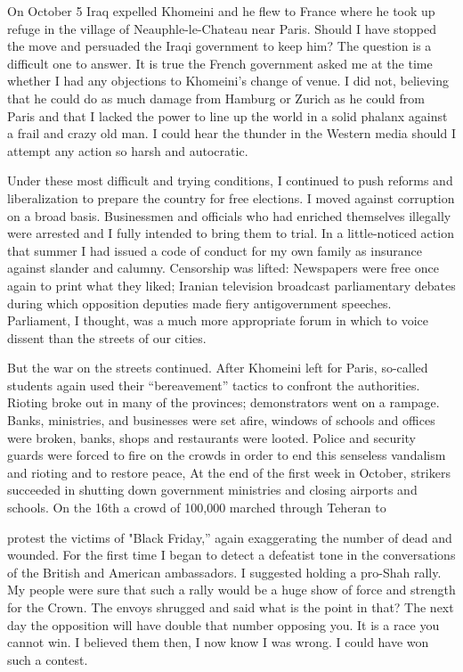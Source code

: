 On October 5 Iraq expelled Khomeini and he flew to France where he took up refuge in the village of Neauphle-le-Chateau near Paris. Should I have stopped the move and persuaded the Iraqi government to keep him? The question is a difficult one to answer. It is true the French government asked me at the time whether I had any objections to Khomeini’s change of venue. I did not, believing that he could do as much damage from Hamburg or Zurich as he could from Paris and that I lacked the power to line up the world in a solid phalanx against a frail and crazy old man. I could hear the thunder in the Western media should I attempt any action so harsh and autocratic. 

Under these most difficult and trying conditions, I continued to push reforms and liberalization to prepare the country for free elections. I moved against corruption on a broad basis. Businessmen and officials who had enriched themselves illegally were arrested and I fully intended to bring them to trial. In a little-noticed action that summer I had issued a code of conduct for my own family as insurance against slander and calumny. Censorship was lifted: Newspapers were free once again to print what they liked; Iranian television broadcast parliamentary debates during which opposition deputies made fiery antigovernment speeches. Parliament, I thought, was a much more appropriate forum in which to voice dissent than the streets of our cities. 

But the war on the streets continued. After Khomeini left for Paris, so-called students again used their “bereavement” tactics to confront the authorities. Rioting broke out in many of the provinces; demonstrators went on a rampage. Banks, ministries, and businesses were set afire, windows of schools and offices were broken, banks, shops and restaurants were looted. Police and security guards were forced to fire on the crowds in order to end this senseless vandalism and rioting and to restore peace, At the end of the first week in October, strikers succeeded in shutting down government ministries and closing airports and schools. On the 16th a crowd of 100,000 marched through Teheran to 

protest the victims of "Black Friday,” again exaggerating the number of dead and wounded. For the first time I began to detect a defeatist tone in the conversations of the British and American ambassadors. I suggested holding a pro-Shah rally. My people were sure that such a rally would be a huge show of force and strength for the Crown. The envoys shrugged and said what is the point in that? The next day the opposition will have double that number opposing you. It is a race you cannot win. I believed them then, I now know I was wrong. I could have won such a contest. 

